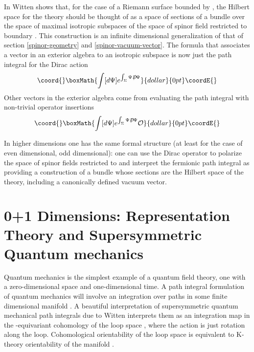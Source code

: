 \documentclass[a4paper,a4paper]{article}
\theoremstyle{conjecture}
\def\Slash#1{#1\!\!\!\!/}
\def\Dirac{\Slash D}
\begin{document}
In \cite{Witten2} Witten shows that, for the case of \myHighlight{$\Sigma$}\coordHE{} a Riemann surface bounded by
\coordHE{},  the Hilbert space for the theory should be thought of as a space of
sections of a bundle \coordHE{} over the space of maximal isotropic subspaces of the space of
spinor field restricted to boundary \myHighlight{$\partial \Sigma$}\coordHE{}.  This construction is an infinite
dimensional generalization of that of section \ref{spinor-geometry} and \ref{spinor-vacuum-vector}.
The formula that associates a vector in an exterior algebra to an isotropic subspace is now
just the path integral for the Dirac action
$$\coord{}\boxMath{\int [d\Psi] e^{\int_\Sigma \Psi \Dirac \Psi}}{dollar}{0pt}\coordE{}$$
Other vectors in the exterior algebra come from evaluating the path integral with non-trivial
operator insertions
$$\coord{}\boxMath{\int [d\Psi] e^{\int_\Sigma \Psi \Dirac \Psi}\mathcal O}{dollar}{0pt}\coordE{}$$

In higher dimensions one has the same formal structure (at least for the case of \coordHE{} even
dimensional, \coordHE{} odd dimensional): one can use the Dirac operator to polarize the
space of spinor fields restricted to \coordHE{} and interpret the fermionic path integral
as providing a construction of a bundle \coordHE{} whose sections are the Hilbert space of the
theory, including a canonically defined vacuum vector.


\section{0+1 Dimensions: Representation Theory and Supersymmetric Quantum mechanics}

Quantum mechanics is the simplest example of a quantum field theory, one with
a zero-dimensional space and one-dimensional time.  A path integral formulation
of quantum mechanics will involve an integration over paths in some finite dimensional
manifold \coordHE{}.  A beautiful interpretation of supersymmetric quantum mechanical path integrals due
to Witten \cite{Atiyah3} interprets them as an integration map in the \coordHE{}-equivariant cohomology
of the loop space \coordHE{}, where the \coordHE{} action is just rotation along the loop.  Cohomological
orientability of the loop space \coordHE{} is equivalent to K-theory orientability of the manifold \coordHE{}.
\end{document}
